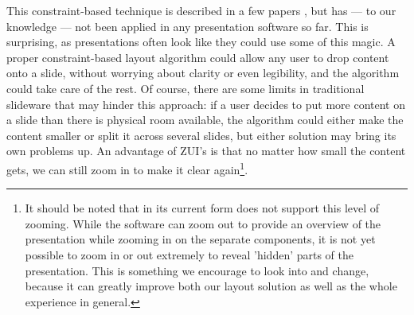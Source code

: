    This constraint-based technique is described in a few papers
   \citep{lok-1,hurst-1}, but has --- to our knowledge --- not been applied in
   any presentation software so far. This is surprising, as presentations often
   look like they could use some of this magic. A proper constraint-based
   layout algorithm could allow any user to drop content onto a slide, without
   worrying about clarity or even legibility, and the algorithm could take care
   of the rest. Of course, there are some limits in traditional slideware that
   may hinder this approach: if a user decides to put more content on a slide
   than there is physical room available, the algorithm could either make the
   content smaller or split it across several slides, but either solution may
   bring its own problems up. An advantage of ZUI's is that no matter how small
   the content gets, we can still zoom in to make it clear again\footnote{It
   should be noted that \mxp in its current form does not support this level of
   zooming. While the software can zoom out to provide an overview of the
   presentation while zooming in on the separate components, it is not yet
   possible to zoom in or out extremely to reveal 'hidden' parts of the
   presentation. This is something we encourage to look into and change,
   because it can greatly improve both our layout solution as well as the whole
   \mxp experience in general.}.


